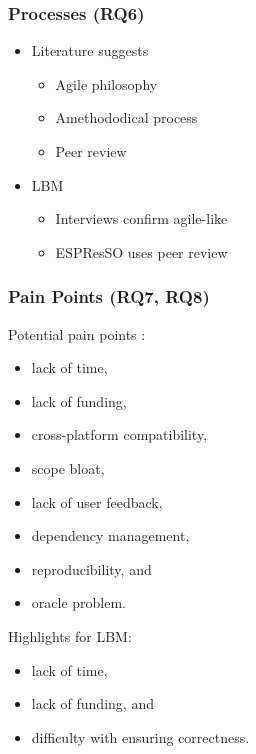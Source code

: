 \documentclass[usenames,dvipsnames]{beamer}
\begin{document}
\begin{frame}

  \frametitle{Processes (RQ6)}

  \begin{itemize}
    \item Literature suggests
    \begin{itemize}
      \item Agile philosophy \citep{CarverEtAl2007, Segal2005}
      \item Amethododical process \citep{Kelly2013}
      \item Peer review \citep{HerouxEtAl2008, OrvizEtAl2017,
      USGS2019}
    \end{itemize}
    \item LBM
    \begin{itemize}
      \item Interviews confirm agile-like%
      \item ESPResSO uses peer review
    \end{itemize}
  \end{itemize}

\end{frame}
  

\begin{frame}

  \frametitle{Pain Points (RQ7, RQ8)}

  Potential pain points \citep{WieseEtAl2019, PintoEtAl2018, KaterbowAndFeulner2018}:
  \begin{itemize}
    \item lack of time,
    \item lack of funding, 
    \item cross-platform compatibility, 
    \item scope bloat, 
    \item lack of user feedback, 
    \item dependency management, 
    \item reproducibility, and 
    \item oracle problem. 
  \end{itemize}

  Highlights for LBM:
  \begin{itemize}
    \item lack of time, 
    \item lack of funding, and 
    \item difficulty with ensuring correctness.
  \end{itemize}

\end{frame}
  
\end{document}
